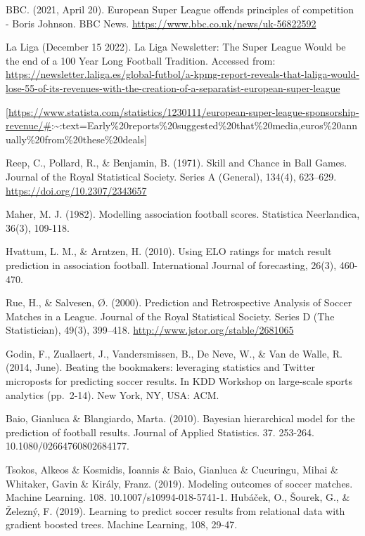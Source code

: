 \documentclass[
]{article}
\begin{document}
BBC. (2021, April 20). European Super League offends principles of
competition - Boris Johnson. BBC News.
\url{https://www.bbc.co.uk/news/uk-56822592}

La Liga (December 15 2022). La Liga Newsletter: The Super League Would
be the end of a 100 Year Long Football Tradition. Accessed from:
\url{https://newsletter.laliga.es/global-futbol/a-kpmg-report-reveals-that-laliga-would-lose-55-of-its-revenues-with-the-creation-of-a-separatist-european-super-league}

{[}\url{https://www.statista.com/statistics/1230111/european-super-league-sponsorship-revenue/\#}:\textasciitilde:text=Early\%20reports\%20suggested\%20that\%20media,euros\%20annually\%20from\%20these\%20deals{]}

Reep, C., Pollard, R., \& Benjamin, B. (1971). Skill and Chance in Ball
Games. Journal of the Royal Statistical Society. Series A (General),
134(4), 623--629. \url{https://doi.org/10.2307/2343657}

Maher, M. J. (1982). Modelling association football scores. Statistica
Neerlandica, 36(3), 109-118.

Hvattum, L. M., \& Arntzen, H. (2010). Using ELO ratings for match
result prediction in association football. International Journal of
forecasting, 26(3), 460-470.

Rue, H., \& Salvesen, Ø. (2000). Prediction and Retrospective Analysis
of Soccer Matches in a League. Journal of the Royal Statistical Society.
Series D (The Statistician), 49(3), 399--418.
\url{http://www.jstor.org/stable/2681065}

Godin, F., Zuallaert, J., Vandersmissen, B., De Neve, W., \& Van de
Walle, R. (2014, June). Beating the bookmakers: leveraging statistics
and Twitter microposts for predicting soccer results. In KDD Workshop on
large-scale sports analytics (pp.~2-14). New York, NY, USA: ACM.

Baio, Gianluca \& Blangiardo, Marta. (2010). Bayesian hierarchical model
for the prediction of football results. Journal of Applied Statistics.
37. 253-264. 10.1080/02664760802684177.

Tsokos, Alkeos \& Kosmidis, Ioannis \& Baio, Gianluca \& Cucuringu,
Mihai \& Whitaker, Gavin \& Király, Franz. (2019). Modeling outcomes of
soccer matches. Machine Learning. 108. 10.1007/s10994-018-5741-1.
Hubáček, O., Šourek, G., \& Železný, F. (2019). Learning to predict
soccer results from relational data with gradient boosted trees. Machine
Learning, 108, 29-47.
\end{document}
